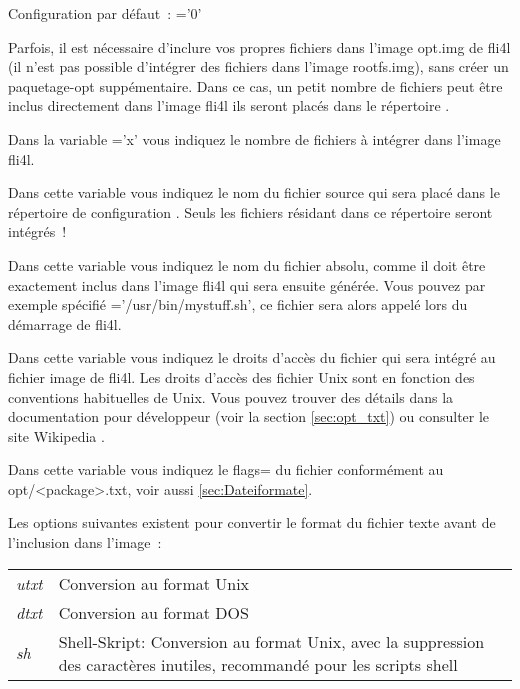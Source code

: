 \begin{description}
        Configuration par défaut~: ='0'

   Parfois, il est nécessaire d'inclure vos propres fichiers dans l'image
   opt.img de fli4l (il n'est pas possible d'intégrer des fichiers dans l'image
   rootfs.img), sans créer un paquetage-opt suppémentaire. Dans ce cas, un petit
   nombre de fichiers peut être inclus directement dans l'image fli4l ils seront
   placés dans le répertoire .
   
   Dans la variable ='x' vous indiquez le nombre de fichiers
   à intégrer dans l'image fli4l.


	Dans cette variable vous indiquez le nom du fichier source qui sera placé dans
	le répertoire de configuration . Seuls les fichiers
	résidant dans ce répertoire seront intégrés~!


	Dans cette variable vous indiquez le nom du fichier absolu, comme il doit être
	exactement inclus dans l'image fli4l qui sera ensuite générée. Vous pouvez par
	exemple spécifié ='/usr/bin/mystuff.sh', ce fichier sera
	alors appelé lors du démarrage de fli4l.


    Dans cette variable vous indiquez le droits d'accès du fichier qui sera intégré
	au fichier image de fli4l. Les droits d'accès des fichier Unix sont en fonction
	des conventions habituelles de Unix. Vous pouvez trouver des détails dans la
	documentation pour développeur (voir la section \ref{sec:opt_txt}) ou consulter
	le site Wikipedia .


    Dans cette variable vous indiquez le flags= du fichier conformément au 
	opt/<package>.txt, voir aussi \ref{sec:Dateiformate}.
	
	Les options suivantes existent pour convertir le format du fichier texte avant
	de l'inclusion dans l'image~:
    \newline\newline
    \begin{tabular}{lp{6cm}}
        \emph{utxt} & Conversion au format Unix\\
        \emph{dtxt} & Conversion au format DOS\\
        \emph{sh}   & Shell-Skript: Conversion au format Unix, avec la suppression des
		caractères inutiles, recommandé pour les scripts shell
    \end{tabular}

\end{description}


